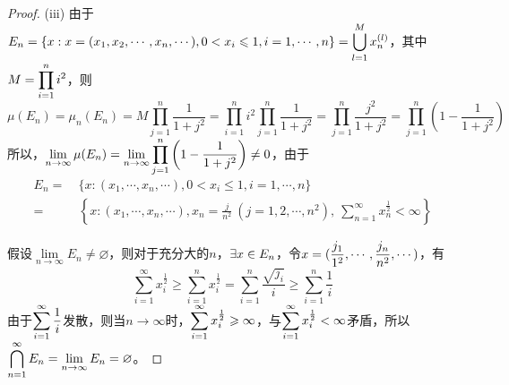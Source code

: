 \documentclass[12pt, a4paper, oneside]{ctexart}
\begin{document}
\begin{proof}
(iii) 由于$\displaystyle E_n = \{x:x=(x_1,x_2,\cdots,x_n,\cdots),0<x_i\leqslant 1,i=1,\cdots, n\}=\bigcup_{l=1}^Mx_n^{(l)}$，其中$\displaystyle M = \prod_{i=1}^ni^2$，则
\begin{equation*}
    \mu(E_n) = \mu_n(E_n) = M\prod_{j=1}^n\frac{1}{1+j^2} = \prod_{i=1}^ni^2\prod_{j=1}^n\frac{1}{1+j^2} = \prod_{j=1}^n\frac{j^2}{1+j^2} = \prod_{j=1}^n\left(1-\frac{1}{1+j^2}\right)
\end{equation*}
所以，$\displaystyle \lim_{n\rightarrow\infty}\mu(E_n)=\lim_{n\rightarrow\infty}\prod_{j=1}^n\left(1-\frac{1}{1+j^2}\right)\neq 0$，由于
\begin{equation*}
    \begin{aligned}
        E_n=&\ \{x:(x_1,\cdots,x_n,\cdots),0 < x_i\leqslant 1,i=1,\cdots,n\}\\
        =&\ \left\{x:(x_1,\cdots,x_n,\cdots),x_n=\frac{j}{n^2}\ (j=1,2,\cdots, n^2),\ \sum_{n=1}^\infty x^{\frac{1}{2}}_n < \infty\right\}
    \end{aligned}
\end{equation*}

假设$\lim\limits_{n\rightarrow \infty}E_n\neq \varnothing$，则对于充分大的$n$，$\displaystyle\exists x\in E_n$，令$\displaystyle x = (\frac{j_1}{1^2},\cdots,\frac{j_n}{n^2},\cdots)$，有
\begin{equation*}
    \sum_{i=1}^\infty x_i^{\frac{1}{2}}\geqslant \sum_{i=1}^nx_i^{\frac{1}{2}} = \sum_{i=1}^n\frac{\sqrt{j_i}}{i}\geqslant \sum_{i=1}^n\frac{1}{i}
\end{equation*}
由于$\displaystyle\sum_{i=1}^{\infty}\frac{1}{i}$发散，则当$n\rightarrow \infty$时，$\displaystyle \sum_{i=1}^\infty x_i^{\frac{1}{2}}\geqslant \infty$，与$\displaystyle \sum_{i=1}^\infty x_i^{\frac{1}{2}}<\infty$矛盾，所以$\displaystyle\bigcap_{n=1}^\infty E_n=\lim_{n\rightarrow \infty}E_n = \varnothing$。

\end{proof}
\iffalse
\centerline{
    \texttt{[image: figure.png]}
}
\fi
\iffalse
\renewcommand\arraystretch{0.8} %
\begin{table}[!htbp] %
    \centering %
    \begin{tabular}{p{1cm}<{\centering}p{1cm}<{\centering}p{3cm}<{\centering}p{5cm}<{\centering}} %
        \toprule
        $x_i$ & $f[x_1]$ & $f[x_i,x_{i+1}]$ & $f[x_i,x_{i+1},x_{i+2}]$ \\
        \midrule
        $x_0$ & $f(x_0)$ &                  &                          \\
        $x_0$ & $f(x_0)$ & $f'(x_0)$        &                          \\
        $x_0$ & $f(x_1)$ & $\frac{f(x_1)-f(x_0)}{x_1-x_0}$ & $\frac{f(x_1)-f(x_0)}{(x_1-x_0)^2}-\frac{f'(x_0)}{x_1-x_0}$\\
        \bottomrule
    \end{tabular}
\end{table}

\def\Log{\text{Log}} %
$\Log$ %
\fi
\end{document}
